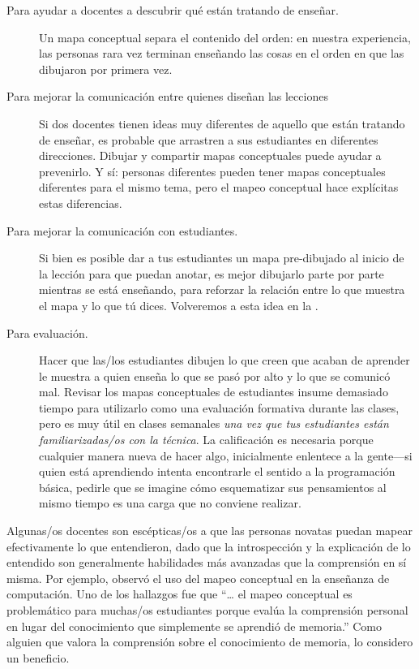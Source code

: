 \begin{description}

\item[Para ayudar a docentes a descubrir qué están tratando de enseñar.]
  Un mapa conceptual separa el contenido del orden:
  en nuestra experiencia,
  las personas rara vez terminan enseñando las cosas en el orden en que las dibujaron por primera vez.

\item[Para mejorar la comunicación entre quienes diseñan las lecciones]
  Si dos docentes tienen ideas muy diferentes de aquello que están tratando de enseñar, 
  es probable que arrastren a sus estudiantes en diferentes direcciones.
  Dibujar y compartir mapas conceptuales puede ayudar a prevenirlo.
  Y sí:
  personas diferentes pueden tener mapas conceptuales diferentes para el mismo tema,
  pero el mapeo conceptual hace explícitas estas diferencias.

\item[Para mejorar la comunicación con estudiantes.]
  Si bien es posible dar a tus estudiantes un mapa pre-dibujado al inicio de la lección para que puedan anotar,
  es mejor dibujarlo parte por parte mientras se está enseñando,
  para reforzar la relación entre lo que muestra el mapa y lo que tú dices.
  Volveremos a esta idea en la .

\item[Para evaluación.]
  Hacer que las/los estudiantes dibujen lo que creen que acaban de aprender
  le muestra a quien enseña lo que se pasó por alto y lo que se comunicó mal.
  Revisar los mapas conceptuales de estudiantes insume demasiado tiempo para utilizarlo como una evaluación formativa durante las clases,
  pero es muy útil en clases semanales \emph{una vez que tus estudiantes están familiarizadas/os con la técnica}.
  La calificación es necesaria porque
  cualquier manera nueva de hacer algo, inicialmente enlentece a la gente---si quien está aprendiendo 
  intenta encontrarle el sentido a la programación básica,
  pedirle que se imagine cómo esquematizar sus pensamientos al mismo tiempo es una carga que no conviene realizar.

\end{description}

Algunas/os docentes son escépticas/os a que las personas novatas puedan mapear efectivamente lo que entendieron,
dado que la introspección y la explicación de lo entendido son generalmente habilidades más avanzadas que la comprensión en sí misma.
Por ejemplo,
\cite{Kepp2008} observó el uso del mapeo conceptual en la enseñanza de computación.
Uno de los hallazgos fue que
``{\ldots} el mapeo conceptual es problemático para muchas/os estudiantes porque
evalúa la comprensión personal en lugar del conocimiento que simplemente se aprendió de memoria.''
Como alguien que valora la comprensión sobre el conocimiento de memoria, 
lo considero un beneficio.

